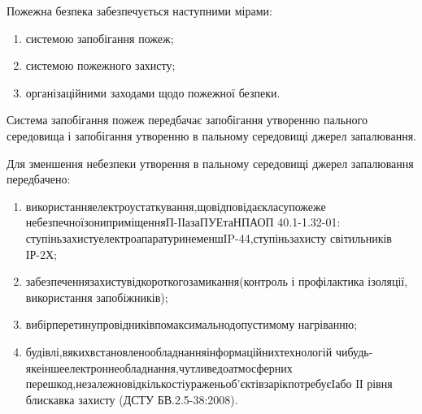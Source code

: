 Пожежна безпека забезпечується наступними мірами:

\begin{enumerate}
	\item системою запобігання пожеж;
	\item системою пожежного захисту;
	\item організаційними заходами щодо пожежної безпеки.
\end{enumerate}

Система запобігання пожеж передбачає запобігання утворенню пального середовища і запобігання утворенню в пальному середовищі джерел запалювання.

Для зменшення небезпеки утворення в пальному середовищі джерел запалювання передбачено:

\begin{enumerate}
	\item використання\hfill електроустаткування,\hfill що\hfill відповідає\hfill класу\hfill пожеже\newline \hspace*{-18mm} небезпечної\hfill зони\hfill приміщення\hfill П-ІІа\hfill за\hfill ПУЕ\hfill та\hfill НПАОП 40.1-1.32-01:\newline \hspace*{-18mm} ступінь\hfill захисту\hfill електроапаратури\hfill не\hfill менш\hfill ІP-44,\hfill ступінь\hfill захисту\newline \hspace*{-18mm} світильників ІР-2Х;
	\item забезпечення\hfill захисту\hfill від\hfill короткого\hfill замикання\hfill (контроль і\newline \hspace*{-18mm} профілактика ізоляції, використання запобіжників);
	\item вибір\hfill перетину\hfill провідників\hfill по\hfill максимально\hfill допустимому\newline \hspace*{-18mm} нагріванню;
	\item будівлі,\hfill в\hfill яких\hfill встановлено\hfill обладнання\hfill інформаційних\hfill технологій\newline \hspace*{-18mm} чи\hfill будь-яке\hfill інше\hfill електронне\hfill обладнання,\hfill чутливе\hfill до\hfill атмосферних\newline \hspace*{-18mm} перешкод,\hfill незалежно\hfill від\hfill кількості\hfill уражень\hfill об’єктів\hfill за\hfill рік\hfill потребує\hfill І\hfill або\newline \hspace*{-18mm} ІІ рівня блискавка захисту (ДСТУ БВ.2.5-38:2008).
\end{enumerate}

